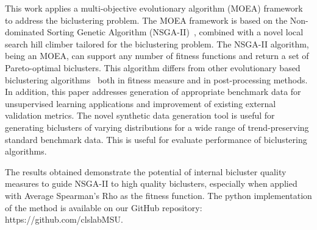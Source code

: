 This work applies a multi-objective evolutionary algorithm (MOEA) framework to address the biclustering problem. The MOEA framework is based on the Non-dominated Sorting Genetic Algorithm (NSGA-II)~\cite{deb2002fast}, combined with a novel local search hill climber tailored for the biclustering problem. The NSGA-II algorithm, being an MOEA, can support any number of fitness functions and return a set of Pareto-optimal biclusters.
This algorithm differs from other evolutionary based biclustering algorithms~\cite{pontes2013configurable, mitra2006multi} both in fitness measure and in post-processing methods.
In addition, this paper addresses generation of appropriate benchmark data for unsupervised learning applications and improvement of existing external validation metrics.
The novel synthetic data generation tool is useful for generating biclusters of varying distributions for a wide range of trend-preserving standard benchmark data. This is useful for evaluate performance of biclustering algorithms.
%

The results obtained demonstrate the potential of internal bicluster quality measures to guide NSGA-II to high quality biclusters, especially when applied with Average Spearman's Rho as the fitness function. The python implementation of the method is available on our GitHub repository: https://github.com/clslabMSU.
